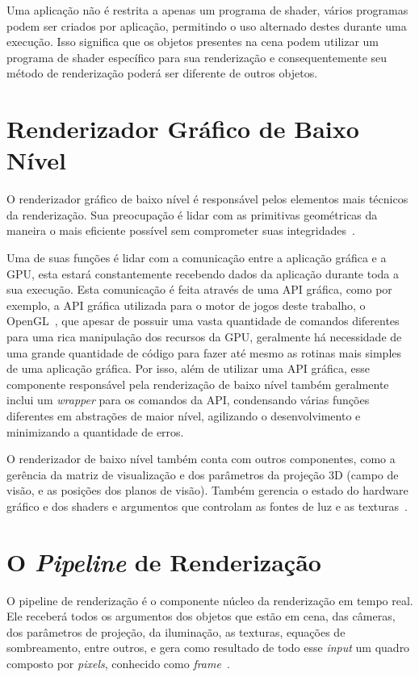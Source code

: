 Uma aplicação não é restrita a apenas um programa de shader, vários programas podem 
ser criados por aplicação, permitindo o uso alternado destes durante uma execução. 
Isso significa que os objetos presentes na cena podem utilizar um programa de shader 
específico para sua renderização e consequentemente seu método de renderização poderá 
ser diferente de outros objetos.

\section{Renderizador Gráfico de Baixo Nível}
\label{lowlevelrenderer}

O renderizador gráfico de baixo nível é responsável pelos elementos mais técnicos da 
renderização. Sua preocupação é lidar com as primitivas geométricas da maneira o mais 
eficiente possível sem comprometer suas integridades~\cite{gregory2009game}.

Uma de suas funções é lidar com a comunicação entre a aplicação gráfica e a GPU, esta 
estará constantemente recebendo dados da aplicação durante toda a sua execução. Esta 
comunicação é feita através de uma API gráfica, como por exemplo, a API gráfica 
utilizada para o motor de jogos deste trabalho, o OpenGL~\cite{shreiner2013opengl}, 
que apesar de possuir uma vasta quantidade de comandos diferentes para uma rica 
manipulação dos recursos da GPU, geralmente há necessidade de uma grande quantidade de 
código para fazer até mesmo as rotinas mais simples de uma aplicação gráfica. Por isso, 
além de utilizar uma API gráfica, esse componente responsável pela renderização de 
baixo nível também geralmente inclui um \textit{wrapper} para os comandos da API, 
condensando várias funções diferentes em abstrações de maior nível, agilizando o 
desenvolvimento e minimizando a quantidade de erros.

O renderizador de baixo nível também conta com outros componentes, como a gerência da 
matriz de visualização e dos parâmetros da projeção 3D (campo de visão, e as posições 
dos planos de visão). Também gerencia o estado do hardware gráfico e dos shaders e
argumentos que controlam as fontes de luz e as texturas~\cite{gregory2009game}.

\section{O \textit{Pipeline} de Renderização}
\label{renderingpipelinesec}

O pipeline de renderização é o componente núcleo da renderização em tempo real. Ele 
receberá todos os argumentos dos objetos que estão em cena, das câmeras, dos parâmetros 
de projeção, da iluminação, as texturas, equações de sombreamento, entre 
outros, e gera como resultado de todo esse \textit{input} um quadro composto por 
\textit{pixels}, conhecido como \textit{frame}~\cite{akenine2008real}.

